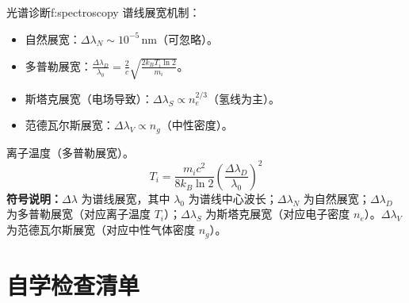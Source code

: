 \begin{formulabox}{光谱诊断}{f:spectroscopy}
谱线展宽机制：
\begin{itemize}
    \item 自然展宽：$\Delta\lambda_N \sim 10^{-5}\,\mathrm{nm}$（可忽略）。
    \item 多普勒展宽：$\frac{\Delta\lambda_D}{\lambda_0} = \frac{2}{c}\sqrt{\frac{2k_B T_i \ln 2}{m_i}}$。
    \item 斯塔克展宽（电场导致）：$\Delta\lambda_S \propto n_e^{2/3}$（氢线为主）。
    \item 范德瓦尔斯展宽：$\Delta\lambda_V \propto n_g$（中性密度）。
\end{itemize}

离子温度（多普勒展宽）。
\[
    T_i = \frac{m_i c^2}{8k_B \ln 2} \left(\frac{\Delta\lambda_D}{\lambda_0}\right)^2
\]
\textbf{符号说明：}$\Delta\lambda$ 为谱线展宽，其中 $\lambda_0$ 为谱线中心波长；$\Delta\lambda_N$ 为自然展宽；$\Delta\lambda_D$ 为多普勒展宽（对应离子温度 $T_i$）；$\Delta\lambda_S$ 为斯塔克展宽（对应电子密度 $n_e$）。$\Delta\lambda_V$ 为范德瓦尔斯展宽（对应中性气体密度 $n_g$）。
\end{formulabox}


\section{自学检查清单}

